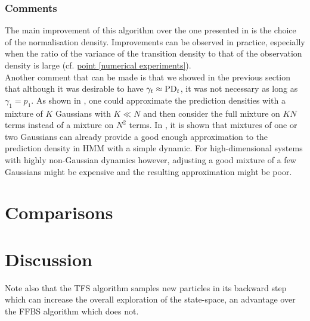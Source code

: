 \subsubsection{Comments}
The main improvement of this algorithm over the one presented in \cite{fearnhead10} is the choice of the normalisation density. Improvements can be observed in practice, especially when the ratio of the variance of the transition density to that of the observation density is large (cf. \hyperref[numerical experiments]{point \ref*{numerical experiments}}).\\

Another comment that can be made is that we showed in the previous section that although it was desirable to have $\gamma_{t}\approx \text{PD}_{t}$, it was not necessary as long as $\gamma_{1}=p_{1}$. As shown in \citet{taghavi12}, one could approximate the prediction densities with a mixture of $K$ Gaussians with $K\ll N$ and then consider the full mixture on $KN$ terms instead of a mixture on $N^{2}$ terms. In \citet{taghavi12}, it is shown that mixtures of one or two Gaussians can already provide a good enough approximation to the prediction density in HMM with a simple dynamic. For high-dimensional systems with highly non-Gaussian dynamics however, adjusting a good mixture of a few Gaussians might be expensive and the resulting approximation might be poor.


\section{Comparisons}

\section{Discussion}
Note also that the TFS algorithm samples new particles in its backward step which can increase the overall exploration of the state-space, an advantage over the FFBS algorithm which does not. 
